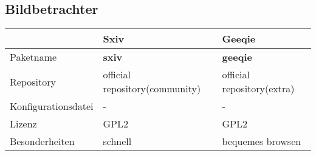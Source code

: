 \subsection{Bildbetrachter}
\begin{tabular}{l|l|l}
~ & Sxiv & Geeqie \\ \hline
Paketname & \textbf{sxiv} & \textbf{geeqie} \\ 
Repository & official repository(community) & official repository(extra) \\
Konfigurationsdatei & - & - \\
Lizenz & GPL2 & GPL2 \\
Besonderheiten & schnell & bequemes browsen \\
\end{tabular}
